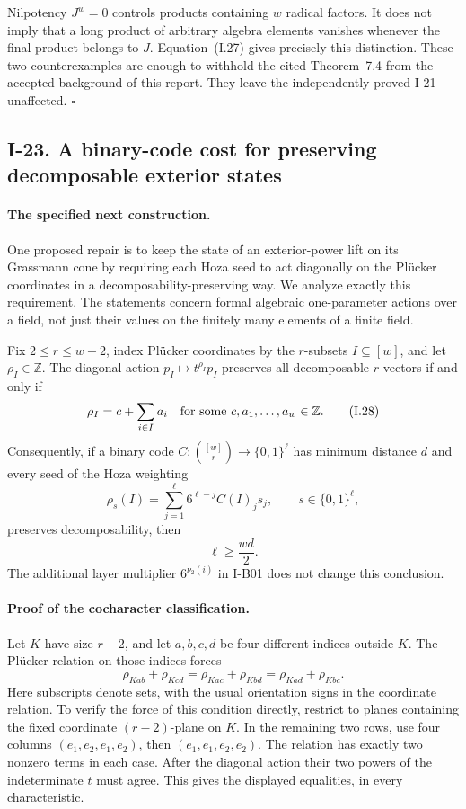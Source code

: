 \documentclass[11pt,a4paper]{article}
\theoremstyle{definition}\newtheorem{definition}{Definition}
\begin{document}
Nilpotency $J^w=0$ controls products containing $w$ radical
factors.  It does not imply that a long product of arbitrary
algebra elements vanishes whenever the final product belongs
to $J$.  Equation~(I.27) gives precisely this distinction.
These two counterexamples are enough to withhold the cited
Theorem~7.4 from the accepted background of this report.
They leave the independently proved I-21 unaffected.
\hfill$\square$


\subsection{I-23. A binary-code cost for preserving decomposable exterior states}
\label{I-23}

\paragraph{The specified next construction.}
One proposed repair is to keep the state of an exterior-power lift
on its Grassmann cone by requiring each Hoza seed to act diagonally
on the Pl\"ucker coordinates in a decomposability-preserving way.
We analyze exactly this requirement.  The statements concern
formal algebraic one-parameter actions over a field, not just
their values on the finitely many elements of a finite field.

Fix $2\le r\le w-2$, index Pl\"ucker coordinates by the
$r$-subsets $I\subseteq[w]$, and let $\rho_I\in\mathbb Z$.
The diagonal action $p_I\mapsto t^{\rho_I}p_I$ preserves all
decomposable $r$-vectors if and only if
\[
 \rho_I=c+\sum_{i\in I}a_i
 \quad\hbox{for some }c,a_1,\ldots,a_w\in\mathbb Z.
 \tag{I.28}\label{eq:I-plucker-additive}
\]
Consequently, if a binary code
$C:\binom{[w]}r\to\{0,1\}^{\ell}$ has minimum distance $d$
and every seed of the Hoza weighting
\[
 \rho_s(I)=\sum_{j=1}^{\ell}6^{\ell-j}C(I)_js_j,
 \qquad s\in\{0,1\}^{\ell},
\]
preserves decomposability, then
\[
 \ell\ge\frac{wd}{2}.
 \tag{I.29}\label{eq:I-plucker-code-cost}
\]
The additional layer multiplier $6^{\nu_2(i)}$ in I-B01
does not change this conclusion.

\paragraph{Proof of the cocharacter classification.}
Let $K$ have size $r-2$, and let $a,b,c,d$ be four different
indices outside $K$.  The Pl\"ucker relation on those indices
forces
\[
 \rho_{Kab}+\rho_{Kcd}
 =\rho_{Kac}+\rho_{Kbd}
 =\rho_{Kad}+\rho_{Kbc}.
\]
Here subscripts denote sets, with the usual orientation signs
in the coordinate relation.  To verify the force of this
condition directly, restrict to planes containing the fixed
coordinate $(r-2)$-plane on $K$.  In the remaining two rows,
use four columns $(e_1,e_2,e_1,e_2)$, then
$(e_1,e_1,e_2,e_2)$.  The relation has exactly two nonzero
terms in each case.  After the diagonal action their two powers
of the indeterminate $t$ must agree.  This gives the displayed
equalities, in every characteristic.
\end{document}
